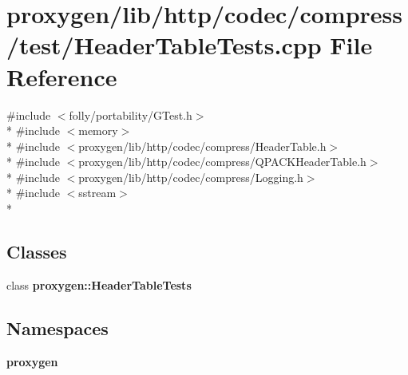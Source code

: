 \section{proxygen/lib/http/codec/compress/test/\+Header\+Table\+Tests.cpp File Reference}
\label{HeaderTableTests_8cpp}
{\ttfamily \#include $<$folly/portability/\+G\+Test.\+h$>$}\\*
{\ttfamily \#include $<$memory$>$}\\*
{\ttfamily \#include $<$proxygen/lib/http/codec/compress/\+Header\+Table.\+h$>$}\\*
{\ttfamily \#include $<$proxygen/lib/http/codec/compress/\+Q\+P\+A\+C\+K\+Header\+Table.\+h$>$}\\*
{\ttfamily \#include $<$proxygen/lib/http/codec/compress/\+Logging.\+h$>$}\\*
{\ttfamily \#include $<$sstream$>$}\\*
\subsection*{Classes}
\begin{DoxyCompactItemize}
\item 
class {\bf proxygen\+::\+Header\+Table\+Tests}
\end{DoxyCompactItemize}
\subsection*{Namespaces}
\begin{DoxyCompactItemize}
\item 
 {\bf proxygen}
\end{DoxyCompactItemize}
